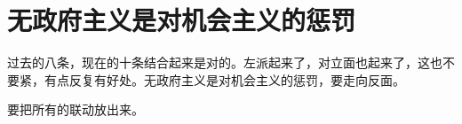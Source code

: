 \section[无政府主义是对机会主义的惩罚（一九六七年四月）]{无政府主义是对机会主义的惩罚}


过去的八条，现在的十条结合起来是对的。左派起来了，对立面也起来了，这也不要紧，有点反复有好处。无政府主义是对机会主义的惩罚，要走向反面。

要把所有的联动放出来。

